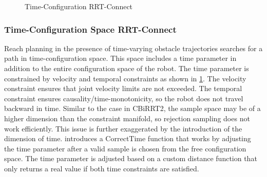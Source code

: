 \documentclass[11pt]{article}
\begin{document}
            \begin{figure}[ht]
                \quad
                \caption{Time-Configuration RRT-Connect}
                \label{fig:time_rrt}
            \end{figure}

        \subsubsection{Time-Configuration Space RRT-Connect}
            Reach planning in the presence of time-varying obstacle trajectories searches for a path in time-configuration space. This space includes a time parameter in addition to the entire configuration space of the robot. The time parameter is constrained by velocity and temporal constraints as shown in \cref{fig:time_rrt}. The velocity constraint ensures that joint velocity limits are not exceeded. The temporal constraint ensures causality/time-monotonicity, so the robot does not travel backward in time. Similar to the case in CBiRRT2, the sample space may be of a higher dimension than the constraint manifold, so rejection sampling does not work efficiently. This issue is further exaggerated by the introduction of the dimension of time. \cite{yang_planning_2018} introduces a CorrectTime function that works by adjusting the time parameter after a valid sample is chosen from the free configuration space. The time parameter is adjusted based on a custom distance function that only returns a real value if both time constraints are satisfied.
\end{document}
